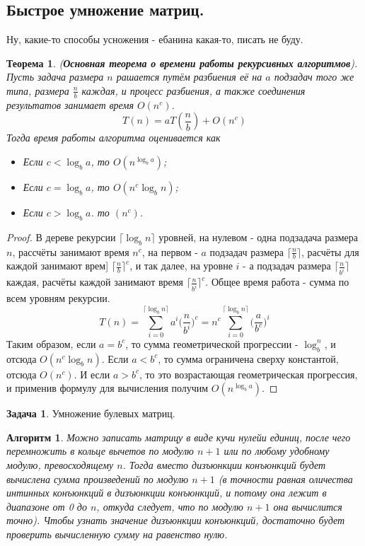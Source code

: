 \documentclass[a4paper]{article}
\theoremstyle{indented}
\newtheorem{theorem}{Теорема}
\newtheorem{alg}{Алгоритм}
\theoremstyle{definition}
\newtheorem{prob}{Задача}
\theoremstyle{remark}
\begin{document}
\subsection{Быстрое умножение матриц.}

Ну, какие-то способы усножения - ебанина какая-то, писать не буду.

\begin{theorem}
    (\textbf{Основная теорема о времени работы рекурсивных алгоритмов}). Пусть задача размера $n$ рашается путём разбиения её на $a$ подзадач того же типа, размера $\frac{n}{b}$ каждая, и процесс разбиения, а также соединения результатов занимает время $O(n^c)$. 
    \[
        T(n)=aT(\frac{n}{b})+O(n^c)
    \]
    Тогда время работы алгоритма оценивается как

    \begin{itemize}
        \item Если $c<\log_b a$, то $O(n^{\log_b a})$;
        \item Если $c=\log_b a$, то $O(n^c \log_b n )$; 
        \item Если $c>\log_b a$. то $(n^c)$. 
    \end{itemize}
\end{theorem}

\begin{proof}
    В дереве рекурсии $\lceil \log_b n \rceil$ уровней, на нулевом - одна подзадача размера $n$, рассчёты занимают время $n^c$, на первом - $a$ подзадач размера $\lceil \frac{n}{b} \rceil$, расчёты для каждой занимают врем] $\lceil \frac{n}{b} \rceil^c$, и так далее, на уровне $i$ - а подзадач размера $\lceil \frac{n}{b^i}\rceil$ каждая, расчёты каждой занимают время $\lceil \frac{n}{b^i}\rceil^c$. Общее время работа - сумма по всем уровням рекурсии.
    \[
        T(n)= \sum_{i=0}^{\lceil \log_b n \rceil} a^i\biggl(\frac{n}{b^i}\biggr)^c=n^c \sum_{i=0}^{\lceil \log_b n \rceil} \biggl(\frac{a}{b^c}\biggr)^i
    \] 
    Таким образом, если $a=b^c$, то сумма геометрической прогрессии - $\log_b^n$, и отсюда $O(n^c\log_b n)$. Если $a<b^c$, то сумма ограничена сверху константой, отсюда $O(n^c)$. И если $a>b^c$, то это возрастающая геометрическая прогрессия, и применив формулу для вычисления получим $O(n^{\log_b a})$. 
\end{proof}

\begin{prob}
    Умножение булевых матриц.
\end{prob}

\begin{alg}
    Можно записать матрицу в виде кучи нулейи единиц, после чего перемножить в кольце вычетов по модулю $n+1$ или по любому удобному модулю, превосходящему $n$. Тогда вместо дизъюнкции конъюнкций будет вычислена сумма произведений по модулю $n+1$ (в точности равная оличества интинных конъюнкций в дизъюнкции конъюнкций, и потому она лежит в диапазоне от 0 до $n$, откуда следует, что по модулю $n+1$ она вычислится точно). Чтобы узнать значение дизъюнкции конъюнкций, достаточно будет проверить вычисленную сумму на равенство нулю.
\end{alg} \ 
\end{document}
